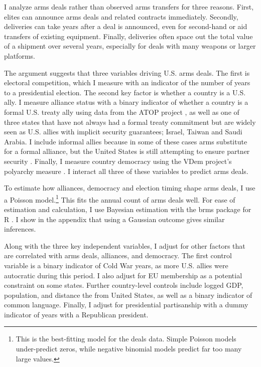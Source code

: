 \documentclass[12pt]{article}
\begin{document}
I analyze arms deals rather than observed arms transfers for three reasons.
First, elites can announce arms deals and related contracts immediately. 
Secondly, deliveries can take years after a deal is announced, even for second-hand or aid transfers of existing equipment. 
Finally, deliveries often space out the total value of a shipment over several years, especially for deals with many weapons or larger platforms. 


The argument suggests that three variables driving U.S. arms deals. 
The first is electoral competition, which I measure with an indicator of the number of years to a presidential election. 
The second key factor is whether a country is a U.S. ally. 
I measure alliance status with a binary indicator of whether a country is a formal U.S. treaty ally using data from the ATOP project \citep{Leedsetal2002}, as well as one of three states that have not always had a formal treaty commitment but are widely seen as U.S. allies with implicit security guarantees; Israel, Taiwan and Saudi Arabia. 
I include informal allies because in some of these cases arms substitute for a formal alliance, but the United States is still attempting to ensure partner security \citep{Yarhi-Miloetal2016}. 
Finally, I measure country democracy using the VDem project's polyarchy measure \citep{Coppedgeetal2008}. 
I interact all three of these variables to predict arms deals. 


To estimate how alliances, democracy and election timing shape arms deals, I use a Poisson model.\footnote{This is the best-fitting model for the deals data. Simple Poisson models under-predict zeros, while negative binomial models predict far too many large values.} 
This fits the annual count of arms deals well.
For ease of estimation and calculation, I use Bayesian estimation with the brms package for \textsf{R} \citep{Buerkner2017}. 
I show in the appendix that using a Gaussian outcome gives similar inferences. 


Along with the three key independent variables, I adjust for other factors that are correlated with arms deals, alliances, and democracy. 
The first control variable is a binary indicator of Cold War years, as more U.S. allies were autocratic during this period. 
I also adjust for EU membership as a potential constraint on some states. 
Further country-level controls include logged GDP, population, and distance the from United States, as well as a binary indicator of common language. 
Finally, I adjust for presidential partisanship with a dummy indicator of years with a Republican president.  
\end{document}
